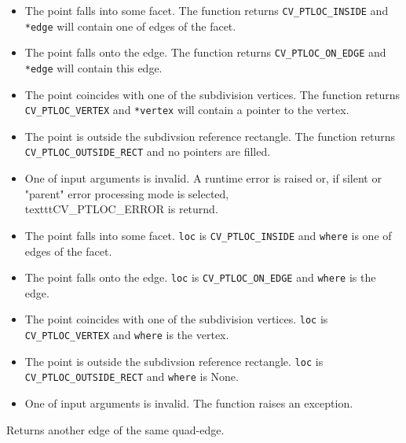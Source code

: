 \ifC
\begin{itemize}
 \item The point falls into some facet. The function returns \texttt{CV\_PTLOC\_INSIDE} and \texttt{*edge} will contain one of edges of the facet.
 \item The point falls onto the edge. The function returns \texttt{CV\_PTLOC\_ON\_EDGE} and \texttt{*edge} will contain this edge.
 \item The point coincides with one of the subdivision vertices. The function returns \texttt{CV\_PTLOC\_VERTEX} and \texttt{*vertex} will contain a pointer to the vertex.
 \item The point is outside the subdivsion reference rectangle. The function returns \texttt{CV\_PTLOC\_OUTSIDE\_RECT} and no pointers are filled.
 \item One of input arguments is invalid. A runtime error is raised or, if silent or "parent" error processing mode is selected, \\texttt{CV\_PTLOC\_ERROR} is returnd.
\end{itemize}
\fi

\ifPy
\begin{itemize}
 \item The point falls into some facet.                          \texttt{loc} is \texttt{CV\_PTLOC\_INSIDE} and \texttt{where} is one of edges of the facet.
 \item The point falls onto the edge.                            \texttt{loc} is \texttt{CV\_PTLOC\_ON\_EDGE} and \texttt{where} is the edge.
 \item The point coincides with one of the subdivision vertices. \texttt{loc} is \texttt{CV\_PTLOC\_VERTEX} and \texttt{where} is the vertex.
 \item The point is outside the subdivsion reference rectangle.  \texttt{loc} is \texttt{CV\_PTLOC\_OUTSIDE\_RECT} and \texttt{where} is None.
 \item One of input arguments is invalid. The function raises an exception.
\end{itemize}
\fi

Returns another edge of the same quad-edge.


\begin{description}
\end{description}

